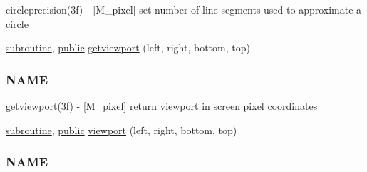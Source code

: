 \begin{DoxyCompactItemize}
\begin{DoxyCompactList}
circleprecision(3f) -\/ \mbox{[}M\+\_\+pixel\mbox{]} set number of line segments used to approximate a circle \end{DoxyCompactList}\item 
\hyperlink{M__stopwatch_83_8txt_acfbcff50169d691ff02d4a123ed70482}{subroutine}, \hyperlink{M__stopwatch_83_8txt_a2f74811300c361e53b430611a7d1769f}{public} \hyperlink{namespacem__pixel_a9f382cf8d3b69e11d1fdd2f2a4f59dea}{getviewport} (left, right, bottom, top)
\begin{DoxyCompactList}\small\item\em \subsubsection*{N\+A\+ME}

getviewport(3f) -\/ \mbox{[}M\+\_\+pixel\mbox{]} return viewport in screen pixel coordinates \end{DoxyCompactList}\item 
\hyperlink{M__stopwatch_83_8txt_acfbcff50169d691ff02d4a123ed70482}{subroutine}, \hyperlink{M__stopwatch_83_8txt_a2f74811300c361e53b430611a7d1769f}{public} \hyperlink{namespacem__pixel_a43247343cd316e3aa075b44b5166e2e9}{viewport} (left, right, bottom, top)
\begin{DoxyCompactList}\small\item\em \subsubsection*{N\+A\+ME}


\end{DoxyCompactList}
\end{DoxyCompactItemize}
